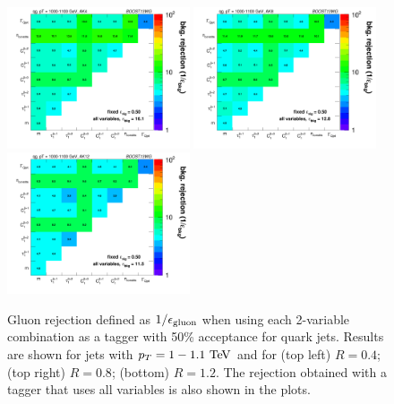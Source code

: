 
%
\begin{figure}
\centering
\includegraphics[width=0.48\textwidth]{./Figures/QGTagging/pT1000/AKtR04/effBkg2D.png}
\includegraphics[width=0.48\textwidth]{./Figures/QGTagging/pT1000/AKtR08/effBkg2D.png}
\includegraphics[width=0.48\textwidth]{./Figures/QGTagging/pT1000/AKtR12/effBkg2D.png}
\caption{Gluon rejection defined as $1/\epsilon_{\rm gluon}$ when using each 2-variable combination 
as a tagger with 50\% acceptance for quark jets. Results are shown for
jets with $\pt=1-1.1 \TeV$ and
for (top left) $R=0.4$; (top right) $R=0.8$; (bottom) $R=1.2$. The rejection obtained with a tagger that uses all variables is also shown
in the plots. }
\label{fig:qg_pt1000_comb}
\end{figure}
%

